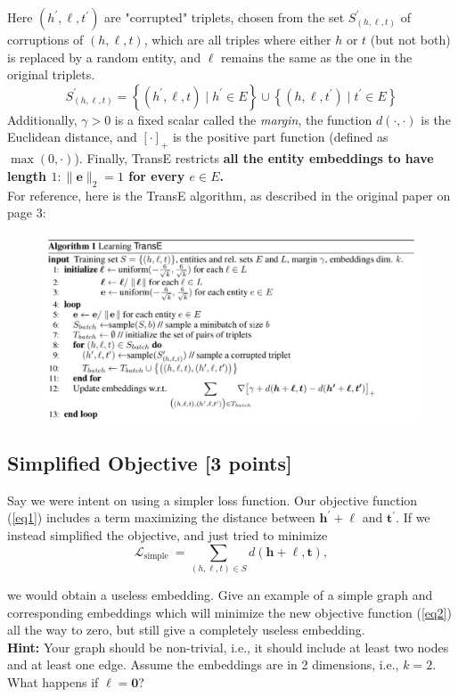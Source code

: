 \documentclass{article}
\numberwithin{figure}{section}
\begin{document}
Here $\left(h^{\prime}, \ell, t^{\prime}\right)$ are "corrupted" triplets, chosen from the set $S_{(h, \ell, t)}^{\prime}$ of corruptions of $(h, \ell, t)$, which are all triples where either $h$ or $t$ (but not both) is replaced by a random entity, and $\ell$ remains the same as the one in the original triplets.
$$
S_{(h, \ell, t)}^{\prime}=\left\{\left(h^{\prime}, \ell, t\right) \mid h^{\prime} \in E\right\} \cup\left\{\left(h, \ell, t^{\prime}\right) \mid t^{\prime} \in E\right\}
$$
Additionally, $\gamma>0$ is a fixed scalar called the \textit{margin}, the function $d(\cdot, \cdot)$ is the Euclidean distance, and $[\cdot]_{+}$ is the positive part function (defined as $\max (0, \cdot)$). Finally, TransE restricts \textbf{all the entity embeddings to have length $1:\|\mathbf{e}\|_2=1$ for every $e \in E$.}\\
For reference, here is the TransE algorithm, as described in the original paper on page 3:
\begin{figure}[H]
    \centering
    \includegraphics[width=1.0\textwidth]{algo2.png}
    \label{fig:algo2}
\end{figure}

\subsection{Simplified Objective [3 points]}
Say we were intent on using a simpler loss function. Our objective function (\ref{eq1}) includes a term maximizing the distance between $\mathbf{h}^{\prime}+\boldsymbol{\ell}$ and $\mathbf{t}^{\prime}$. If we instead simplified the objective, and just tried to minimize
\begin{equation}\label{eq2}
\mathcal{L}_{\text {simple }}=\sum_{(h, \ell, t) \in S} d(\mathbf{h}+\boldsymbol{\ell}, \mathbf{t}),
\end{equation}

we would obtain a useless embedding. Give an example of a simple graph and corresponding embeddings which will minimize the new objective function (\ref{eq2}) all the way to zero, but still give a completely useless embedding.\\
\textbf{Hint:} Your graph should be non-trivial, i.e., it should include at least two nodes and at least one edge. Assume the embeddings are in 2 dimensions, i.e., $k = 2$.
What happens if $\boldsymbol{\ell} = \textbf{0}$?
\end{document}
